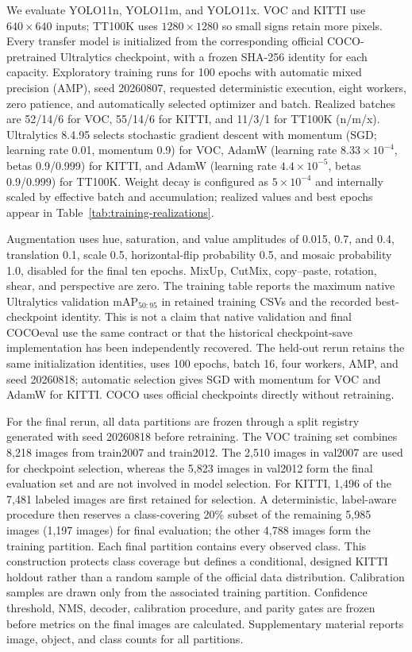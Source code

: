 \documentclass[10pt]{article}
\begin{document}
We evaluate YOLO11n, YOLO11m, and YOLO11x. VOC and KITTI use $640\times640$ inputs; TT100K uses $1280\times1280$ so small signs retain more pixels. Every transfer model is initialized from the corresponding official COCO-pretrained Ultralytics checkpoint, with a frozen SHA-256 identity for each capacity. Exploratory training runs for 100 epochs with automatic mixed precision (AMP), seed 20260807, requested deterministic execution, eight workers, zero patience, and automatically selected optimizer and batch. Realized batches are 52/14/6 for VOC, 55/14/6 for KITTI, and 11/3/1 for TT100K (n/m/x). Ultralytics 8.4.95 selects stochastic gradient descent with momentum (SGD; learning rate 0.01, momentum 0.9) for VOC, AdamW (learning rate $8.33\times10^{-4}$, betas 0.9/0.999) for KITTI, and AdamW (learning rate $4.4\times10^{-5}$, betas 0.9/0.999) for TT100K. Weight decay is configured as $5\times10^{-4}$ and internally scaled by effective batch and accumulation; realized values and best epochs appear in Table~\ref{tab:training-realizations}.

Augmentation uses hue, saturation, and value amplitudes of 0.015, 0.7, and 0.4, translation 0.1, scale 0.5, horizontal-flip probability 0.5, and mosaic probability 1.0, disabled for the final ten epochs. MixUp, CutMix, copy--paste, rotation, shear, and perspective are zero. The training table reports the maximum native Ultralytics validation mAP$_{50:95}$ in retained training CSVs and the recorded best-checkpoint identity. This is not a claim that native validation and final COCOeval use the same contract or that the historical checkpoint-save implementation has been independently recovered. The held-out rerun retains the same initialization identities, uses 100 epochs, batch 16, four workers, AMP, and seed 20260818; automatic selection gives SGD with momentum for VOC and AdamW for KITTI. COCO uses official checkpoints directly without retraining.

For the final rerun, all data partitions are frozen through a split registry generated with seed 20260818 before retraining. The VOC training set combines 8,218 images from train2007 and train2012. The 2,510 images in val2007 are used for checkpoint selection, whereas the 5,823 images in val2012 form the final evaluation set and are not involved in model selection. For KITTI, 1,496 of the 7,481 labeled images are first retained for selection. A deterministic, label-aware procedure then reserves a class-covering 20\% subset of the remaining 5,985 images (1,197 images) for final evaluation; the other 4,788 images form the training partition. Each final partition contains every observed class. This construction protects class coverage but defines a conditional, designed KITTI holdout rather than a random sample of the official data distribution. Calibration samples are drawn only from the associated training partition. Confidence threshold, NMS, decoder, calibration procedure, and parity gates are frozen before metrics on the final images are calculated. Supplementary material reports image, object, and class counts for all partitions.
\end{document}
